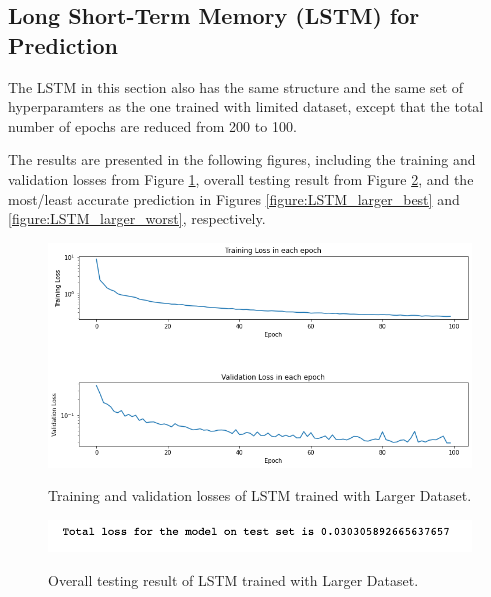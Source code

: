 \subsection{Long Short-Term Memory (LSTM) for Prediction}

The LSTM in this section also has the same structure and the same set of hyperparamters as the one trained with limited dataset, except that the total number of epochs are reduced from 200 to 100.

The results are presented in the following figures, including the training and validation losses from Figure \ref{figure:LSTM_larger_losses}, overall testing result from Figure \ref{figure:LSTM_larger_testing}, and the most/least accurate prediction in Figures \ref{figure:LSTM_larger_best} and \ref{figure:LSTM_larger_worst}, respectively.

\begin{figure}[H]
    \caption{Training and validation losses of LSTM trained with Larger Dataset.}
    \includegraphics[scale=0.6]{figures/mantle_convection_images/larger_dataset/LSTM_trainingData.png}
    \label{figure:LSTM_larger_losses}
\end{figure}

\begin{figure}[H]
    \caption{Overall testing result of LSTM trained with Larger Dataset.}
    \includegraphics[scale=0.8]{figures/mantle_convection_images/larger_dataset/LSTM_OverallTesting.png}
    \label{figure:LSTM_larger_testing}
\end{figure}

